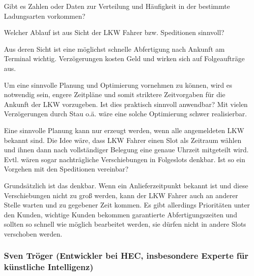 Gibt es Zahlen oder Daten zur Verteilung und Häufigkeit in der bestimmte Ladungsarten vorkommen?



Welcher Ablauf ist aus Sicht der LKW Fahrer bzw. Speditionen sinnvoll?

Aus deren Sicht ist eine möglichst schnelle Abfertigung nach Ankunft am Terminal wichtig. Verzögerungen kosten Geld und wirken sich auf Folgeaufträge aus. 



Um eine sinnvolle Planung und Optimierung vornehmen zu können, wird es notwendig sein, engere Zeitpläne und somit striktere Zeitvorgaben für die Ankunft der LKW vorzugeben. Ist dies praktisch sinnvoll anwendbar? Mit vielen Verzögerungen durch Stau o.ä. wäre eine solche Optimierung schwer realisierbar.



Eine sinnvolle Planung kann nur erzeugt werden, wenn alle angemeldeten LKW bekannt sind. Die Idee wäre, dass LKW Fahrer einen Slot als Zeitraum wählen und ihnen dann nach vollständiger Belegung eine genaue Uhrzeit mitgeteilt wird. Evtl. wären sogar nachträgliche Verschiebungen in Folgeslots denkbar. Ist so ein Vorgehen mit den Speditionen vereinbar?

Grundsätzlich ist das denkbar. Wenn ein Anlieferzeitpunkt bekannt ist und diese Verschiebungen nicht zu groß werden, kann der LKW Fahrer auch an anderer Stelle warten und zu gegebener Zeit kommen. Es gibt allerdings Prioritäten unter den Kunden, wichtige Kunden bekommen garantierte Abfertigungszeiten und sollten so schnell wie möglich bearbeitet werden, sie dürfen nicht in andere Slots verschoben werden.



\subsubsection*{Sven Tröger (Entwickler bei HEC, insbesondere Experte für künstliche Intelligenz)}